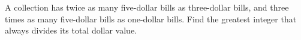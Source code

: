 A collection has twice as many five-dollar bills as three-dollar bills, and three times as many five-dollar bills as one-dollar bills. Find the greatest integer that always divides its total dollar value.
